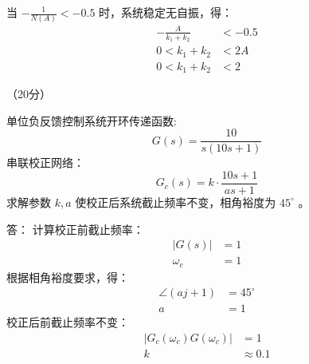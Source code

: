 {{		当 $-\frac{1}{N(A)}<-0.5$ 时，系统稳定无自振，得：
		\begin{align*}
		-\frac{A}{k_1+k_2} &< -0.5 \\
		0<k_1+k_2&<2A\\
		0<k_1+k_2&<2
		\end{align*}
		
	}
}





\question（20分）{单位负反馈控制系统开环传递函数:
	$$G(s)=\frac{10}{s(10s+1)}$$
	串联校正网络：
	$$G_c(s)=k\cdot\frac{10 s+1}{a s+1}$$
	求解参数 $k,a$ 使校正后系统截止频率不变，相角裕度为 $45^\circ$ 。
	
	\onlyanswer
	{
		答：
		计算校正前截止频率：
		\begin{align*}
		|G(s)| &=1 \\
		\omega_c &=1
		\end{align*}
		根据相角裕度要求，得：
		\begin{align*}
		\angle (a j+1)&=45^{\circ} \\
		a &=1
		\end{align*}
		校正后前截止频率不变：
		\begin{align*}
		|G_c(\omega_c)G(\omega_c)| &=1 \\
		k &\approx 0.1
		\end{align*}
	}
}




